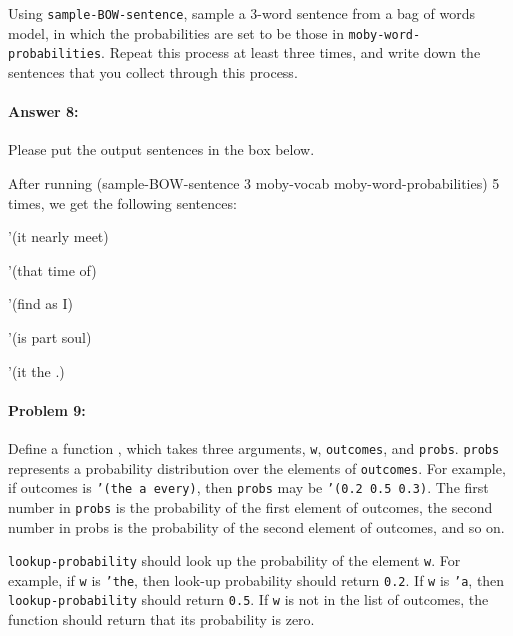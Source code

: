 \documentclass[10pt]{article}
\newenvironment{AnswerBox}{\begin{mdframed}[style=simple]}{\end{mdframed}}
\newcommand{\required}[1]{{\color{blue}{#1}}}
\begin{document}
Using \texttt{sample-BOW-sentence}, sample a 3-word sentence from a
bag of words model, in which the probabilities are set to be those in
\texttt{moby-word-probabilities}. Repeat this process at least three
times, and write down the sentences that you collect through this
process.

\paragraph{Answer 8:} Please put the output sentences in the box below.

\begin{AnswerBox}%

    
After running (sample-BOW-sentence 3 moby-vocab moby-word-probabilities) 5 times, we get the following sentences:

'(it nearly meet)

'(that time of)

'(find as I)

'(is part soul)

'(it the .)

\end{AnswerBox}%

\hrulefill %

\paragraph{Problem 9:}

Define a function \required{\texttt{lookup-probability}}, which takes three
arguments, \texttt{w}, \texttt{outcomes}, and
\texttt{probs}. \texttt{probs} represents a probability distribution
over the elements of \texttt{outcomes}. For example, if outcomes is
\texttt{'(the a every)}, then \texttt{probs} may be
\texttt{'(0.2 0.5 0.3)}. The first number in \texttt{probs} is the
probability of the first element of outcomes, the second number in
probs is the probability of the second element of outcomes, and so on.

\texttt{lookup-probability} should look up the probability of the
element \texttt{w}. For example, if \texttt{w} is \texttt{'the},
then look-up probability should return \texttt{0.2}. If \texttt{w}
is \texttt{'a}, then \texttt{lookup-probability} should return
\texttt{0.5}.  If \texttt{w} is not in the list of outcomes,
the function should return that its probability is zero.
\end{document}
